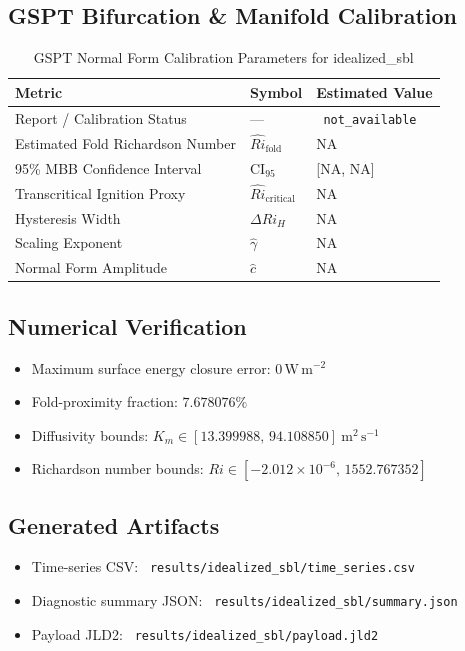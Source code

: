 \subsection{GSPT Bifurcation \& Manifold Calibration}
\begin{table}[htbp]
\centering
\caption{GSPT Normal Form Calibration Parameters for idealized\_sbl}
\label{tab:gspt_calibration_idealized_sbl_idealized_sbl_80x2m_9h_report}
\begin{tabular}{lll}
\hline
{\bfseries Metric} & {\bfseries Symbol} & {\bfseries Estimated Value} \\
\hline
Report / Calibration Status & --- & \texttt{ not\_available } \\
Estimated Fold Richardson Number & $\hat{Ri}_{\mathrm{fold}}$ & NA \\
95\% MBB Confidence Interval & CI$_{95}$ & [NA, NA] \\
Transcritical Ignition Proxy & $\hat{Ri}_{\mathrm{critical}}$ & NA \\
Hysteresis Width & $\Delta Ri_H$ & NA \\
Scaling Exponent & $\hat{\gamma}$ & NA \\
Normal Form Amplitude & $\hat{c}$ & NA \\
\hline
\end{tabular}
\end{table}

\subsection{Numerical Verification}
\begin{itemize}
  \item Maximum surface energy closure error:
  $0\,\mathrm{W\,m^{-2}}$
  \item Fold-proximity fraction:
  $7.678076\%$
  \item Diffusivity bounds:
  $K_m \in [13.399988,\,94.108850]~\mathrm{m^2\,s^{-1}}$
  \item Richardson number bounds:
  $Ri \in [-2.012 \times 10^{-6},\,1552.767352]$
\end{itemize}

\subsection{Generated Artifacts}
\begin{itemize}
  \item Time-series CSV: \texttt{ results/idealized\_sbl/time\_series.csv }
  \item Diagnostic summary JSON: \texttt{ results/idealized\_sbl/summary.json }
  \item Payload JLD2: \texttt{ results/idealized\_sbl/payload.jld2 }
\end{itemize}

